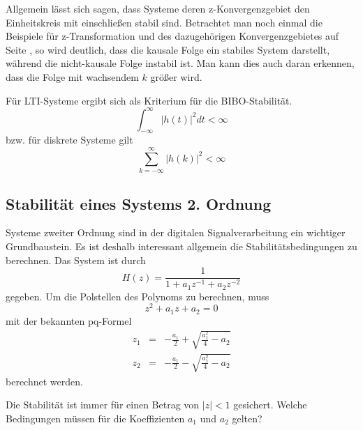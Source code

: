 Allgemein lässt sich sagen, dass Systeme deren z-Konvergenzgebiet den Einheitskreis
mit einschließen stabil sind. Betrachtet man noch einmal die
Beispiele für z-Transformation und des dazugehörigen Konvergenzgebietes
auf Seite \pageref{Bsp:z_TrafoUndROC}, so wird
deutlich, dass die kausale Folge ein stabiles System darstellt, während die
nicht-kausale Folge instabil ist. Man kann dies auch daran erkennen, dass
die Folge mit wachsendem $k$ größer wird.

Für LTI-Systeme ergibt sich als Kriterium für die BIBO-Stabilität.
\begin{equation}\label{eq:BIBO_INTEGRAL}
    \int_{-\infty}^{\infty} |h(t)|^2 dt < \infty
\end{equation}
bzw. für diskrete Systeme gilt
\begin{equation}\label{eq:BIBO_Diskret}
    \sum_{k = -\infty}^{\infty}|h(k)|^2 < \infty
\end{equation}

\subsection{Stabilität eines Systems 2. Ordnung}
Systeme zweiter Ordnung sind in der digitalen Signalverarbeitung
ein wichtiger Grundbaustein. Es ist deshalb interessant allgemein
die Stabilitätsbedingungen zu berechnen.
Das System ist durch
\begin{equation}
    H(z)=\frac{1}{1+a_{1}z^{-1}+a_{2}z^{-2}}
\end{equation}
gegeben. Um die Polstellen des Polynoms zu berechnen, muss
\begin{equation}
    z^{2}+a_{1}z+a_{2}=0
\end{equation}
\zB mit der bekannten pq-Formel
\begin{eqnarray}
    z_{1}& = &-\frac{a_{1}}{2}+\sqrt{\frac{a_{1}^{2}}{4}-a_{2}}\\
    z_{2}& = &-\frac{a_{1}}{2}-\sqrt{\frac{a_{1}^{2}}{4}-a_{2}}
\end{eqnarray}
berechnet werden.

Die Stabilität ist immer für einen Betrag von $\left|z\right|<1$
gesichert. Welche Bedingungen müssen für die Koeffizienten
$a_1$ und $a_2$ gelten?

